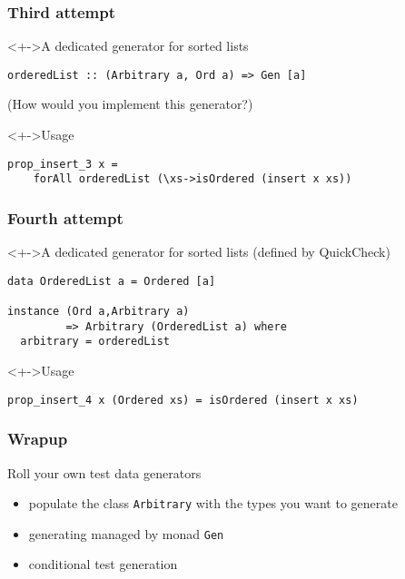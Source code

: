 \documentclass{beamer}
\begin{document}
\begin{frame}[fragile]
  \frametitle{Third attempt}
  \begin{block}<+->{A dedicated generator for sorted lists}
\begin{verbatim}
orderedList :: (Arbitrary a, Ord a) => Gen [a]
\end{verbatim}
    (How would you implement this generator?)
  \end{block}
  \begin{block}<+->{Usage}
\begin{verbatim}
prop_insert_3 x =
    forAll orderedList (\xs->isOrdered (insert x xs))
\end{verbatim}
  \end{block}
\end{frame}
\begin{frame}[fragile]
  \frametitle{Fourth attempt}
  \begin{block}<+->{A dedicated generator for sorted lists (defined by QuickCheck)}
\begin{verbatim}
data OrderedList a = Ordered [a]

instance (Ord a,Arbitrary a)
         => Arbitrary (OrderedList a) where
  arbitrary = orderedList
\end{verbatim}
  \end{block}
  \begin{block}<+->{Usage}
\begin{verbatim}
prop_insert_4 x (Ordered xs) = isOrdered (insert x xs)
\end{verbatim}
  \end{block}
\end{frame}
\begin{frame}
  \frametitle{Wrapup}
  \begin{alertblock}{Roll your own test data generators}
  \begin{itemize}
  \item populate the class \texttt{Arbitrary} with the types you want to generate
  \item generating managed by monad \texttt{Gen}
  \item conditional test generation
  \end{itemize}
  \end{alertblock}
\end{frame}

\end{document}
